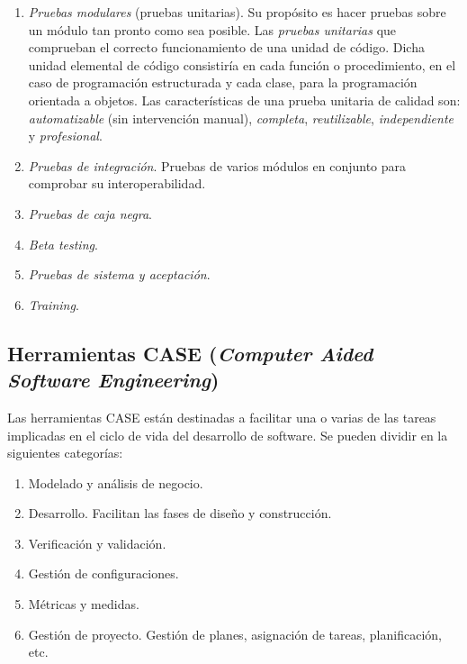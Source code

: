 \begin{enumerate}
\item \emph{Pruebas modulares} (pruebas unitarias). Su propósito es hacer pruebas sobre un módulo tan pronto como sea posible. Las \emph{pruebas unitarias} que comprueban el correcto funcionamiento de una unidad de código. Dicha unidad elemental de código consistiría en cada función o procedimiento, en el caso de programación estructurada y cada clase, para la programación orientada a objetos. Las características de una prueba unitaria de calidad son: \emph{automatizable} (sin intervención manual), \emph{completa},  \emph{reutilizable}, \emph{independiente} y \emph{profesional}.

\item \emph{Pruebas de integración}. Pruebas de varios módulos en conjunto para comprobar su interoperabilidad.

\item \emph{Pruebas de caja negra}.

\item \emph{Beta testing}.

\item \emph{Pruebas de sistema y aceptación}.

\item \emph{Training}.
\end{enumerate}






\subsection{Herramientas CASE (\emph{Computer Aided Software Engineering})}

Las herramientas CASE están destinadas a facilitar una o varias 
de las tareas implicadas en el ciclo de vida del desarrollo de software. Se 
pueden dividir en la siguientes categorías:

\begin{enumerate}
\item Modelado y análisis de negocio.
\item Desarrollo. Facilitan las fases de diseño y construcción.
\item Verificación y validación.
\item Gestión de configuraciones.
\item Métricas y medidas.
\item Gestión de proyecto. Gestión de planes, asignación de tareas, planificación, etc.
\end{enumerate}




